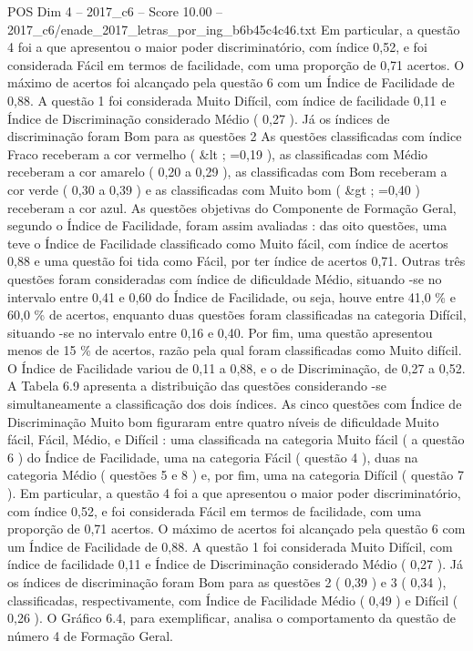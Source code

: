 \begin{textsample}{POS Dim 4 – 2017\_c6 – Score 10.00 – 2017\_c6/enade\_2017\_letras\_por\_ing\_b6b45c4c46.txt}
Em particular, a questão 4 foi a que apresentou o maior poder discriminatório, com índice 0,52, e foi considerada Fácil em termos de facilidade, com uma proporção de 0,71 acertos.
O máximo de acertos foi alcançado pela questão 6 com um Índice de Facilidade de 0,88.
A questão 1 foi considerada Muito Difícil, com índice de facilidade 0,11 e Índice de Discriminação considerado Médio ( 0,27 ).
Já os índices de discriminação foram Bom para as questões 2 As questões classificadas com índice Fraco receberam a cor vermelho ( \&lt ; =0,19 ), as classificadas com Médio receberam a cor amarelo ( 0,20 a 0,29 ), as classificadas com Bom receberam a cor verde ( 0,30 a 0,39 ) e as classificadas com Muito bom ( \&gt ; =0,40 ) receberam a cor azul.
As questões objetivas do Componente de Formação Geral, segundo o Índice de Facilidade, foram assim avaliadas : das oito questões, uma teve o Índice de Facilidade classificado como Muito fácil, com índice de acertos 0,88 e uma questão foi tida como Fácil, por ter índice de acertos 0,71.
Outras três questões foram consideradas com índice de dificuldade Médio, situando -se no intervalo entre 0,41 e 0,60 do Índice de Facilidade, ou seja, houve entre 41,0 \% e 60,0 \% de acertos, enquanto duas questões foram classificadas na categoria Difícil, situando -se no intervalo entre 0,16 e 0,40.
Por fim, uma questão apresentou menos de 15 \% de acertos, razão pela qual foram classificadas como Muito difícil.
O Índice de Facilidade variou de 0,11 a 0,88, e o de Discriminação, de 0,27 a 0,52.
A Tabela 6.9 apresenta a distribuição das questões considerando -se simultaneamente a classificação dos dois índices.
As cinco questões com Índice de Discriminação Muito bom figuraram entre quatro níveis de dificuldade Muito fácil, Fácil, Médio, e Difícil : uma classificada na categoria Muito fácil ( a questão 6 ) do Índice de Facilidade, uma na categoria Fácil ( questão 4 ), duas na categoria Médio ( questões 5 e 8 ) e, por fim, uma na categoria Difícil ( questão 7 ).
Em particular, a questão 4 foi a que apresentou o maior poder discriminatório, com índice 0,52, e foi considerada Fácil em termos de facilidade, com uma proporção de 0,71 acertos.
O máximo de acertos foi alcançado pela questão 6 com um Índice de Facilidade de 0,88.
A questão 1 foi considerada Muito Difícil, com índice de facilidade 0,11 e Índice de Discriminação considerado Médio ( 0,27 ).
Já os índices de discriminação foram Bom para as questões 2 ( 0,39 ) e 3 ( 0,34 ), classificadas, respectivamente, com Índice de Facilidade Médio ( 0,49 ) e Difícil ( 0,26 ).
O Gráfico 6.4, para exemplificar, analisa o comportamento da questão de número 4 de Formação Geral.

\end{textsample}
